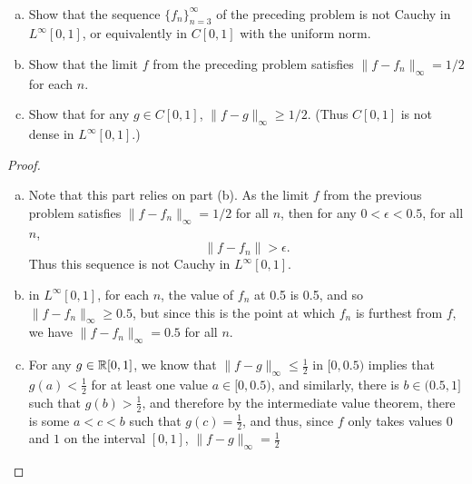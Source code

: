 \pagebreak
\begin{pblm}~ %
	\begin{enumerate}[(a)]
	\item Show that the sequence $\{f_n\}_{n=3}^\infty$ of the preceding problem is not 
		Cauchy in $L^\infty[0,1]$, or equivalently in $C[0,1]$ with the uniform norm. 
	\item Show that the limit $f$ from the preceding problem satisfies $\|f - f_n\|_\infty = 1/2$ 
		for each $n$. 
	\item Show that for any $g \in C[0,1]$, $\|f - g\|_\infty \ge 1/2$. (Thus $C[0,1]$ is not 
		dense in $L^\infty[0,1]$.)
	\end{enumerate}
\begin{proof}
	~
	\begin{enumerate}[(a)]
	\item Note that this part relies on part (b). 
		As the limit $f$ from the previous problem satisfies $\|f - f_n\|_\infty = 1/2$ for 
		all $n$, then for any $0 < \epsilon < 0.5$, for all $n$, $$\|f - f_n\| > \epsilon.$$ Thus 
		this sequence is not Cauchy in $L^\infty[0,1]$. 
	\item in $L^\infty[0,1]$, for each $n$, the value of $f_n$ at 0.5 is 0.5, and so 
		$\|f - f_n\|_\infty\ge 0.5$, but since this is the point at which 
		$f_n$ is furthest from $f$, we have $\|f - f_n\|_\infty = 0.5$ for all $n$. 
		\begin{center}
		\end{center}
	\item For any $g \in \mathbb{R}[0,1]$, we know that $\|f - g\|_\infty \le \frac{1}{2}$ in $[0, 0.5)$ implies that 
		$g(a) < \frac{1}{2}$ for at least one value $a \in [0,0.5)$, and similarly, 
		there is $b \in (0.5, 1]$ such that $g(b) > \frac{1}{2}$, and therefore by the intermediate value 
		theorem, there is some $a < c < b$ such that $g(c) = \frac{1}{2}$, and thus, since $f$ only takes values 
		$0$ and $1$ on the interval $[0,1]$, $\|f - g\|_\infty = \frac{1}{2}$
	\end{enumerate}
\end{proof}
\end{pblm}

